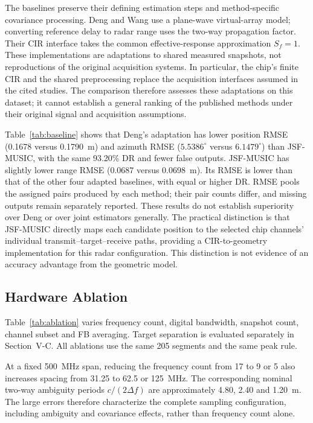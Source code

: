 The baselines preserve their defining estimation steps and method-specific covariance processing. Deng and Wang use a plane-wave virtual-array model; converting reference delay to radar range uses the two-way propagation factor. Their CIR interface takes the common effective-response approximation $S_f=1$. These implementations are adaptations to shared measured snapshots, not reproductions of the original acquisition systems. In particular, the chip's finite CIR and the shared preprocessing replace the acquisition interfaces assumed in the cited studies. The comparison therefore assesses these adaptations on this dataset; it cannot establish a general ranking of the published methods under their original signal and acquisition assumptions.

Table~\ref{tab:baseline} shows that Deng's adaptation has lower position RMSE (0.1678 versus 0.1790~m) and azimuth RMSE ($5.5386^\circ$ versus $6.1479^\circ$) than JSF-MUSIC, with the same 93.20\% DR and fewer false outputs. JSF-MUSIC has slightly lower range RMSE (0.0687 versus 0.0698~m). Its RMSE is lower than that of the other four adapted baselines, with equal or higher DR. RMSE pools the assigned pairs produced by each method; their pair counts differ, and missing outputs remain separately reported. These results do not establish superiority over Deng or over joint estimators generally. The practical distinction is that JSF-MUSIC directly maps each candidate position to the selected chip channels' individual transmit--target--receive paths, providing a CIR-to-geometry implementation for this radar configuration. This distinction is not evidence of an accuracy advantage from the geometric model.

\subsection{Hardware Ablation}

Table~\ref{tab:ablation} varies frequency count, digital bandwidth, snapshot count, channel subset and FB averaging. Target separation is evaluated separately in Section~V-C. All ablations use the same 205 segments and the same peak rule.

At a fixed 500~MHz span, reducing the frequency count from 17 to 9 or 5 also increases spacing from 31.25 to 62.5 or 125~MHz. The corresponding nominal two-way ambiguity periods $c/(2\Delta f)$ are approximately 4.80, 2.40 and 1.20~m. The large errors therefore characterize the complete sampling configuration, including ambiguity and covariance effects, rather than frequency count alone.

